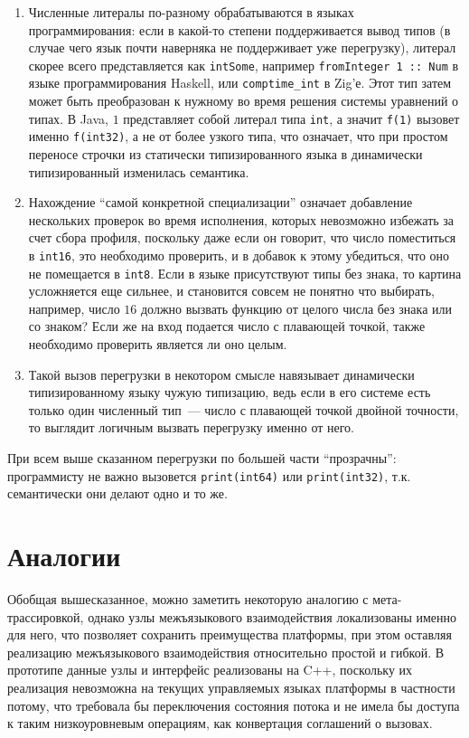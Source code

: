 \documentclass[times,specification,annotation]{itmo-student-thesis}
\begin{document}
\begin{enumerate}
	\item Численные литералы по-разному обрабатываются в языках программирования: если в какой-то степени поддерживается вывод типов (в случае чего язык почти наверняка не поддерживает уже перегрузку), литерал скорее всего представляется как \texttt{intSome}, например \texttt{fromInteger 1 :: Num} в языке программирования Haskell, или \texttt{comptime\_int} в Zig'е. Этот тип затем может быть преобразован к нужному во время решения системы уравнений о типах. В Java, $1$ представляет собой литерал типа \texttt{int}, а значит \texttt{f(1)} вызовет именно \texttt{f(int32)}, а не от более узкого типа, что означает, что при простом переносе строчки из статически типизированного языка в динамически типизированный изменилась семантика.
	\item Нахождение ``самой конкретной специализации'' означает добавление нескольких проверок во время исполнения, которых невозможно избежать за счет сбора профиля, поскольку даже если он говорит, что число поместиться в \texttt{int16}, это необходимо проверить, и в добавок к этому убедиться, что оно не помещается в \texttt{int8}. Если в языке присутствуют типы без знака, то картина усложняется еще сильнее, и становится совсем не понятно что выбирать, например, число $16$ должно вызвать функцию от целого числа без знака или со знаком? Если же на вход подается число с плавающей точкой, также необходимо проверить является ли оно целым.
	\item Такой вызов перегрузки в некотором смысле навязывает динамически типизированному языку чужую типизацию, ведь если в его системе есть только один численный тип~--- число с плавающей точкой двойной точности, то выглядит логичным вызвать перегрузку именно от него.
\end{enumerate}
При всем выше сказанном перегрузки по большей части ``прозрачны'': программисту не важно вызовется \texttt{print(int64)} или \texttt{print(int32)}, т.к. семантически они делают одно и то же.

\section{Аналогии}
Обобщая вышесказанное, можно заметить некоторую аналогию с мета-трассировкой, однако узлы межъязыкового взаимодействия локализованы именно для него, что позволяет сохранить преимущества платформы, при этом оставляя реализацию межъязыкового взаимодействия относительно простой и гибкой. В прототипе данные узлы и интерфейс реализованы на C++, поскольку их реализация невозможна на текущих управляемых языках платформы в частности потому, что требовала бы переключения состояния потока и не имела бы доступа к таким низкоуровневым операциям, как конвертация соглашений о вызовах.
\end{document}
